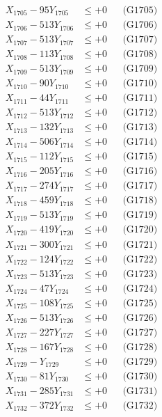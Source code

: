 \documentclass[a4paper,10pt]{article}
\begin{document}
{\begin{align}
X_{1705} - 95Y_{1705} &\leq +0 && \text{(G1705)} \\
X_{1706} - 513Y_{1706} &\leq +0 && \text{(G1706)} \\
X_{1707} - 513Y_{1707} &\leq +0 && \text{(G1707)} \\
X_{1708} - 113Y_{1708} &\leq +0 && \text{(G1708)} \\
X_{1709} - 513Y_{1709} &\leq +0 && \text{(G1709)} \\
X_{1710} - 90Y_{1710} &\leq +0 && \text{(G1710)} \\
\allowbreak
X_{1711} - 44Y_{1711} &\leq +0 && \text{(G1711)} \\
X_{1712} - 513Y_{1712} &\leq +0 && \text{(G1712)} \\
X_{1713} - 132Y_{1713} &\leq +0 && \text{(G1713)} \\
X_{1714} - 506Y_{1714} &\leq +0 && \text{(G1714)} \\
X_{1715} - 112Y_{1715} &\leq +0 && \text{(G1715)} \\
X_{1716} - 205Y_{1716} &\leq +0 && \text{(G1716)} \\
X_{1717} - 274Y_{1717} &\leq +0 && \text{(G1717)} \\
X_{1718} - 459Y_{1718} &\leq +0 && \text{(G1718)} \\
X_{1719} - 513Y_{1719} &\leq +0 && \text{(G1719)} \\
X_{1720} - 419Y_{1720} &\leq +0 && \text{(G1720)} \\
\allowbreak
X_{1721} - 300Y_{1721} &\leq +0 && \text{(G1721)} \\
X_{1722} - 124Y_{1722} &\leq +0 && \text{(G1722)} \\
X_{1723} - 513Y_{1723} &\leq +0 && \text{(G1723)} \\
X_{1724} - 47Y_{1724} &\leq +0 && \text{(G1724)} \\
X_{1725} - 108Y_{1725} &\leq +0 && \text{(G1725)} \\
X_{1726} - 513Y_{1726} &\leq +0 && \text{(G1726)} \\
X_{1727} - 227Y_{1727} &\leq +0 && \text{(G1727)} \\
X_{1728} - 167Y_{1728} &\leq +0 && \text{(G1728)} \\
X_{1729} - Y_{1729} &\leq +0 && \text{(G1729)} \\
X_{1730} - 81Y_{1730} &\leq +0 && \text{(G1730)} \\
\allowbreak
X_{1731} - 285Y_{1731} &\leq +0 && \text{(G1731)} \\
X_{1732} - 372Y_{1732} &\leq +0 && \text{(G1732)} \\

\end{align}}
\end{document}

